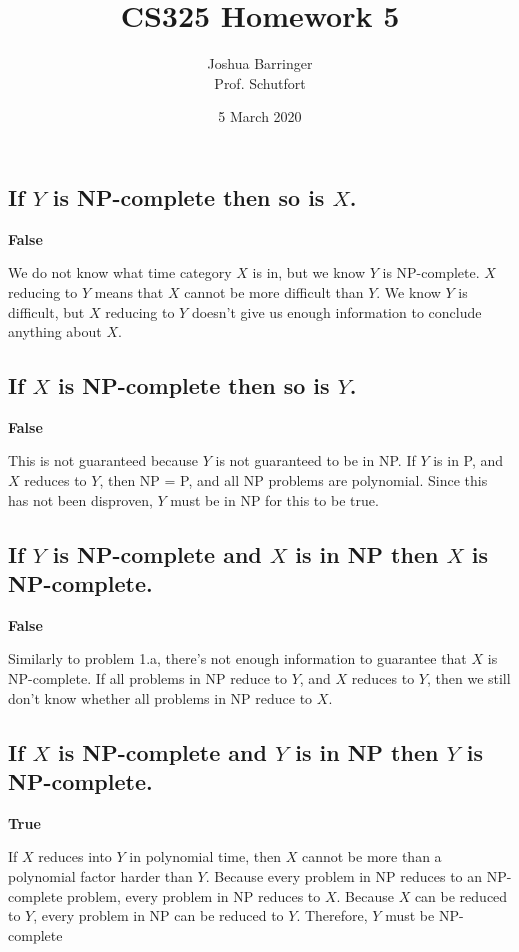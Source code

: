 \documentclass{article}
\title{CS325 Homework 5}
\author{Joshua Barringer \\
        Prof. Schutfort}
\date{5 March 2020}
\begin{document}
\maketitle

\section{}

\subsection{If $Y$ is NP-complete then so is $X$.}

\textbf{False}

We do not know what time category $X$ is in, but we know $Y$ is NP-complete.  $X$ reducing to $Y$ means that $X$ cannot be more difficult than $Y$.  We know $Y$ is difficult, but $X$ reducing to $Y$ doesn't give us enough information to conclude anything about $X$.

\subsection{If $X$ is NP-complete then so is $Y$.}

\textbf{False}

This is not guaranteed because $Y$ is not guaranteed to be in NP.  If $Y$ is in P, and $X$ reduces to $Y$, then NP = P, and all NP problems are polynomial.  Since this has not been disproven, $Y$ must be in NP for this to be true.

\subsection{If $Y$ is NP-complete and $X$ is in NP then $X$ is NP-complete.}

\textbf{False}

Similarly to problem 1.a, there's not enough information to guarantee that $X$ is NP-complete.  If all problems in NP reduce to $Y$, and $X$ reduces to $Y$, then we still don't know whether all problems in NP reduce to $X$.

\subsection{If $X$ is NP-complete and $Y$ is in NP then $Y$ is NP-complete.}

\textbf{True}

If $X$ reduces into $Y$ in polynomial time, then $X$ cannot be more than a polynomial factor harder than $Y$.  Because every problem in NP reduces to an NP-complete problem, every problem in NP reduces to $X$.  Because $X$ can be reduced to $Y$, every problem in NP can be reduced to $Y$.  Therefore, $Y$ must be NP-complete
\end{document}
